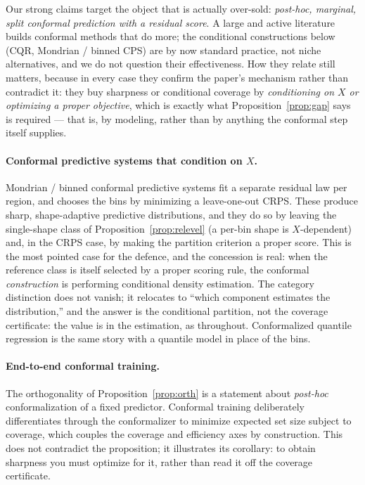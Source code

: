 \documentclass[10pt]{article} %
\theoremstyle{definition}
\begin{document}
Our strong claims target the object that is actually over-sold: \emph{post-hoc, marginal,
split conformal prediction with a residual score}. A large and active literature builds
conformal methods that do more; the conditional constructions below (CQR, Mondrian / binned
CPS) are by now standard practice, not niche alternatives, and we do not question their
effectiveness. How they relate still matters, because in every case they confirm the paper's
mechanism rather than contradict it: they buy sharpness or conditional coverage by
\emph{conditioning on $X$ or optimizing a proper objective}, which is exactly what
Proposition~\ref{prop:gap} says is required --- that is, by modeling, rather than by anything
the conformal step itself supplies.

\paragraph{Conformal predictive systems that condition on $X$.}
Mondrian / binned conformal predictive systems \citep{bostrom2021mondrian} fit a separate
residual law per region, and \citet{toccaceli2026crps} chooses the bins by minimizing a
leave-one-out CRPS. These produce sharp, shape-adaptive predictive
distributions, and they do so by leaving the single-shape class of
Proposition~\ref{prop:relevel} (a per-bin shape is $X$-dependent) and, in the CRPS case,
by making the partition criterion a proper score. This is the most pointed case for the
defence, and the concession is real: when the reference class is itself selected by
a proper scoring rule, the conformal \emph{construction} is performing conditional density
estimation. The category distinction does not vanish; it relocates to ``which component
estimates the distribution,'' and the answer is the conditional partition, not the
coverage certificate: the value is in the estimation, as throughout. Conformalized
quantile regression \citep{romano2019conformalized} is the same story with a quantile
model in place of the bins.

\paragraph{End-to-end conformal training.}
The orthogonality of Proposition~\ref{prop:orth} is a statement about \emph{post-hoc}
conformalization of a fixed predictor. Conformal training
\citep{stutz2022learning,correia2024information} deliberately differentiates through the
conformalizer to minimize expected set size subject to coverage, which couples the
coverage and efficiency axes by construction. This does not contradict the proposition; it
illustrates its corollary: to obtain sharpness you must optimize for it, rather than
read it off the coverage certificate.
\end{document}
